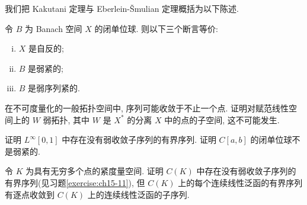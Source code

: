\documentclass[../../main.tex]{subfiles}
\begin{document}
我们把 Kakutani 定理与 Eberlein-\v{S}mulian 定理概括为以下陈述.

\begin{theorem}[弱紧性的刻画]\label{theorem:ch15-weak-compactness}
令 $B$ 为 Banach 空间 $X$ 的闭单位球. 则以下三个断言等价:
\begin{enumerate}[(i)]
\item $X$ 是自反的;
\item $B$ 是弱紧的;
\item $B$ 是弱序列紧的.
\end{enumerate}
\end{theorem}

\begin{exercise}\label{exercise:ch15-13}
在不可度量化的一般拓扑空间中, 序列可能收敛于不止一个点. 证明对赋范线性空间上的 $W$ 弱拓扑, 其中 $W$ 是 $X^{*}$ 的分离 $X$ 中的点的子空间, 这不可能发生.
\end{exercise}

\begin{exercise}\label{exercise:ch15-14}
证明 $L^{\infty}[0,1]$ 中存在没有弱收敛子序列的有界序列. 证明 $C[a,b]$ 的闭单位球不是弱紧的.
\end{exercise}

\begin{exercise}\label{exercise:ch15-15}
令 $K$ 为具有无穷多个点的紧度量空间. 证明 $C(K)$ 中存在没有弱收敛子序列的有界序列(见习题\cref{exercise:ch15-11}), 但 $C(K)$ 上的每个连续线性泛函的有界序列有逐点收敛到 $C(K)$ 上的连续线性泛函的子序列.
\end{exercise}
\end{document}
